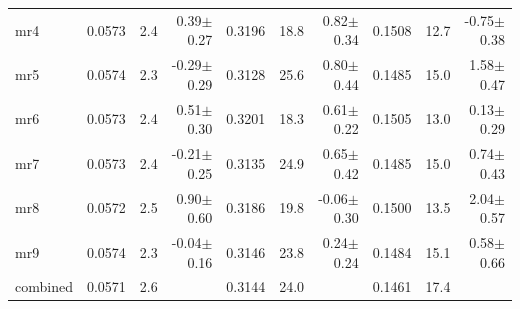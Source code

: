 \documentclass{article}
\begin{document}
\begin{table}[t]
\begin{center}
\begin{small}
\begin{sc}
\begin{tabular}{l|rr r|rr r|rr r}
mr4        & 0.0573 &   2.4 &  0.39$\pm$0.27& 0.3196 &  18.8 &  0.82$\pm$0.34& 0.1508 &  12.7 & -0.75$\pm$0.38 \\ 
mr5        & 0.0574 &   2.3 & -0.29$\pm$0.29& 0.3128 &  25.6 &  0.80$\pm$0.44& 0.1485 &  15.0 &  1.58$\pm$0.47 \\ 
mr6        & 0.0573 &   2.4 &  0.51$\pm$0.30& 0.3201 &  18.3 &  0.61$\pm$0.22& 0.1505 &  13.0 &  0.13$\pm$0.29 \\ 
mr7        & 0.0573 &   2.4 & -0.21$\pm$0.25& 0.3135 &  24.9 &  0.65$\pm$0.42& 0.1485 &  15.0 &  0.74$\pm$0.43 \\ 
mr8        & 0.0572 &   2.5 &  0.90$\pm$0.60& 0.3186 &  19.8 & -0.06$\pm$0.30& 0.1500 &  13.5 &  2.04$\pm$0.57 \\ 
mr9        & 0.0574 &   2.3 & -0.04$\pm$0.16& 0.3146 &  23.8 &  0.24$\pm$0.24& 0.1484 &  15.1 &  0.58$\pm$0.66 \\ 
\abovespace\belowspace
combined   & 0.0571 &   2.6 &  & 0.3144 &  24.0 &  & 0.1461 &  17.4 &   \\ 
\hline
\end{tabular}
\end{sc}
\end{small}
\end{center}
\vskip -0.1in
\end{table}


\end{document}
